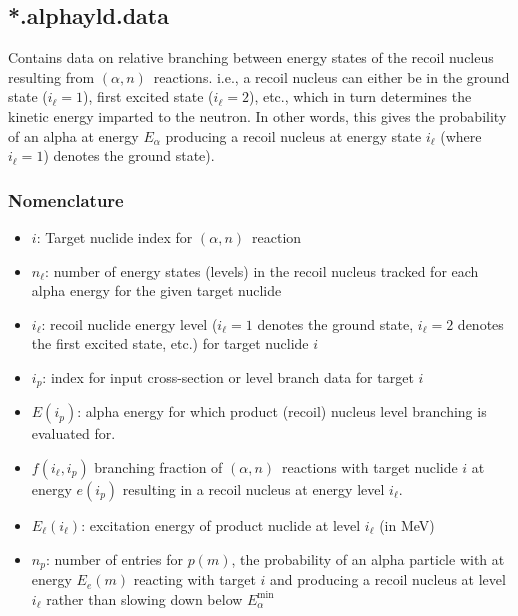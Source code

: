 \documentclass[10pt]{article}
\newcommand{\alphn}[0]{$\left(\alpha,n\right)$}
\begin{document}
\subsection{*.alphayld.data}

Contains data on relative branching between energy states of the recoil nucleus resulting from \alphn\ reactions. i.e., a recoil nucleus can either be in the ground state ($i_\ell=1$), first excited state ($i_\ell=2$), etc., which in turn determines the kinetic energy imparted to the neutron. In other words, this gives the probability of an alpha at energy $E_\alpha$ producing a recoil nucleus at energy state $i_\ell$ (where $i_\ell=1$) denotes the ground state).

\subsubsection{Nomenclature}
\begin{itemize}
\item $i$: Target nuclide index for \alphn\ reaction
\item $n_\ell$: number of energy states (levels) in the recoil nucleus tracked for each alpha energy for the given target nuclide
\item $i_\ell$: recoil nuclide energy level ($i_\ell=1$ denotes the ground state, $i_\ell=2$ denotes the first excited state, etc.) for target nuclide $i$
\item $i_p$: index for input cross-section or level branch data for target $i$
\item $E \left( i_p \right)$: alpha energy for which product (recoil) nucleus level branching is evaluated for.
\item $f\left(i_\ell, i_p \right)$ branching fraction of \alphn\ reactions with target nuclide $i$ at energy $e\left(i_p\right)$ resulting in a recoil nucleus at energy level $i_\ell$.
\item $E_\ell \left( i_\ell \right)$: excitation energy of product nuclide at level $i_\ell$ (in MeV)
\item $n_p$: number of entries for $p\left(m\right)$, the probability of an alpha particle with at energy $E_e\left(m\right)$ reacting with target $i$ and producing a recoil nucleus at level $i_\ell$ rather than slowing down below $E_\alpha^{\min}$
\end{itemize}
\end{document}
